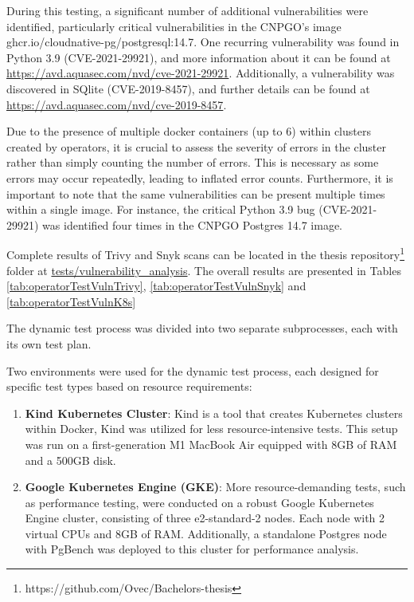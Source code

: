 During this testing, a significant number of additional vulnerabilities were identified, particularly critical vulnerabilities in the CNPGO's image ghcr.io/cloudnative-pg/postgresql:14.7. One recurring vulnerability was found in Python 3.9 (CVE-2021-29921), and more information about it can be found at \url{https://avd.aquasec.com/nvd/cve-2021-29921}. Additionally, a vulnerability was discovered in SQlite (CVE-2019-8457), and further details can be found at \url{https://avd.aquasec.com/nvd/cve-2019-8457}.

Due to the presence of multiple docker containers (up to 6) within clusters created by operators, it is crucial to assess the severity of errors in the cluster rather than simply counting the number of errors. This is necessary as some errors may occur repeatedly, leading to inflated error counts. Furthermore, it is important to note that the same vulnerabilities can be present multiple times within a single image. For instance, the critical Python 3.9 bug (CVE-2021-29921) was identified four times in the CNPGO Postgres 14.7 image.

Complete results of Trivy and Snyk scans can be located in the thesis repository\footnote[6]{https://github.com/Ovec/Bachelors-thesis} folder at \url{tests/vulnerability_analysis}. The overall results are presented in Tables \ref{tab:operatorTestVulnTrivy}, \ref{tab:operatorTestVulnSnyk} and \ref{tab:operatorTestVulnK8s}


The dynamic test process was divided into two separate subprocesses, each with its own
test plan.

Two environments were used for the dynamic test process, each designed for specific test types based on resource requirements:

\begin{enumerate}
    \item \textbf{Kind Kubernetes Cluster}: Kind is a tool that creates Kubernetes clusters within Docker, Kind was utilized for less resource-intensive tests. This setup was run on a first-generation M1 MacBook Air equipped with 8GB of RAM and a 500GB disk.
    \item \textbf{Google Kubernetes Engine (GKE)}: More resource-demanding tests, such as performance testing, were conducted on a robust Google Kubernetes Engine cluster, consisting of three e2-standard-2 nodes. Each node with 2 virtual CPUs and 8GB of RAM. Additionally, a standalone Postgres node with PgBench was deployed to this cluster for performance analysis.
\end{enumerate}

